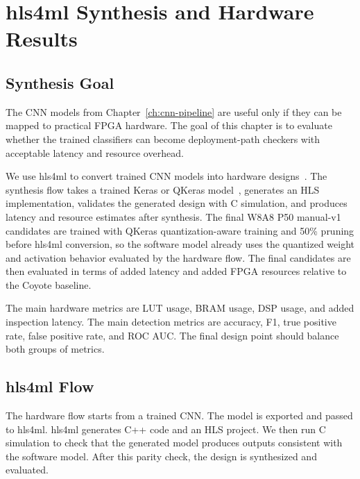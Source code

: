\chapter{hls4ml Synthesis and Hardware Results}
\label{ch:hls4ml-results}

\section{Synthesis Goal}
\label{sec:synthesis-goal}

The CNN models from Chapter~\ref{ch:cnn-pipeline} are useful only if they can be mapped to practical FPGA hardware. The goal of this chapter is to evaluate whether the trained classifiers can become deployment-path checkers with acceptable latency and resource overhead.

We use hls4ml to convert trained CNN models into hardware designs~\cite{duarte2018fast,aarrestad2021fast}. The synthesis flow takes a trained Keras or QKeras model~\cite{coelho2020qkeras}, generates an HLS implementation, validates the generated design with C simulation, and produces latency and resource estimates after synthesis. The final W8A8 P50 manual-v1 candidates are trained with QKeras quantization-aware training and 50\% pruning before hls4ml conversion, so the software model already uses the quantized weight and activation behavior evaluated by the hardware flow. The final candidates are then evaluated in terms of added latency and added FPGA resources relative to the Coyote baseline.

The main hardware metrics are LUT usage, BRAM usage, DSP usage, and added inspection latency. The main detection metrics are accuracy, F1, true positive rate, false positive rate, and ROC AUC. The final design point should balance both groups of metrics.

\section{hls4ml Flow}
\label{sec:hls4ml-flow}

The hardware flow starts from a trained CNN. The model is exported and passed to hls4ml. hls4ml generates C++ code and an HLS project. We then run C simulation to check that the generated model produces outputs consistent with the software model. After this parity check, the design is synthesized and evaluated.

